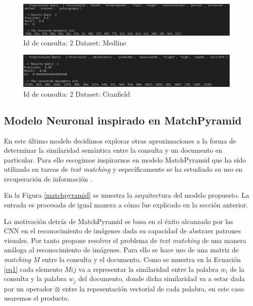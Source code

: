 \documentclass{llncs}
\begin{document}
\begin{figure}
	\begin{center}
		\includegraphics[width=\linewidth]{ ./images/lstm-med-q2.png}
		\caption{ Id de consulta: 2 Dataset: Medline }
		\label{cran_q1}
	\end{center}
\end{figure}

\begin{figure}
	\begin{center}
		\includegraphics[width=\linewidth]{ ./images/lstm-cran-q2.png}
		\caption{ Id de consulta: 2 Dataset: Cranfield }
		\label{cran_q2}
	\end{center}
\end{figure}

\subsection{Modelo Neuronal inspirado en MatchPyramid}

 En este último modelo decidimos explorar otras aproximaciones a la forma de determinar la similaridad semántica entre la consulta y un documento en particular. Para ello escogimos inspirarnos en modelo MatchPyramid \cite{193} que ha sido utilizado en tareas de \textit{text matching} y específicamente se ha estudiado su uso en recuperación de información \cite{194}. 
 
  En la Figura \ref{matchpyramid} se muestra la arquitectura del modelo propuesto. La entrada es procesada de igual manera a cómo fue explicado en la sección anterior.
  
La motivación detrás de MatchPyramid se basa en el éxito alcanzado por las CNN en el reconocimiento de imágenes dada su capacidad de abstraer patrones visuales. Por tanto propone resolver el problema de \textit{text matching} de una manera análoga al reconocimiento de imágenes. Para ello se hace uso de una matriz de \textit{matching} $M$ entre la consulta y el documento. Como se muestra en la Ecuación \ref{eq1} cada elemento $M{ij}$ va a representar la similaridad entre la palabra $w_i$ de la consulta y la palabra $w_j$ del documento, donde dicha similaridad va a estar dada por un operador $\otimes$ entre la repesentación vectorial de cada palabra, en este caso usaremos el producto. 
\end{document}
